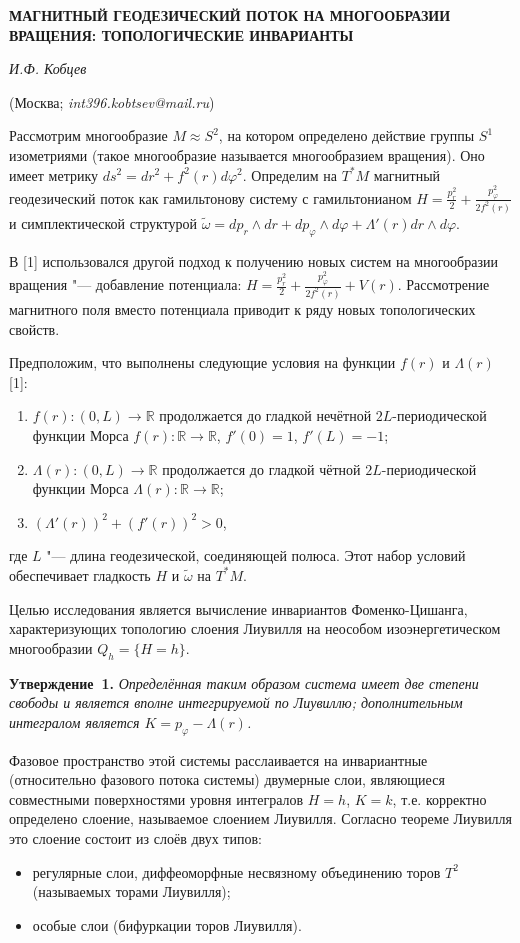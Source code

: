 \begin{center}
    {\bf МАГНИТНЫЙ ГЕОДЕЗИЧЕСКИЙ ПОТОК НА МНОГООБРАЗИИ ВРАЩЕНИЯ: ТОПОЛОГИЧЕСКИЕ ИНВАРИАНТЫ}

    {\it И.Ф. Кобцев}

    (Москва; {\it int396.kobtsev@mail.ru})
\end{center}

Рассмотрим многообразие $M \approx S^2$, на котором определено действие группы $S^1$ изометриями (такое многообразие называется многообразием вращения). Оно имеет метрику $ds^2=dr^2+f^2(r)d\varphi^2$. Определим на $T^*M$ магнитный геодезический поток как гамильтонову систему с гамильтонианом $H = \frac{p_r^2}{2}+\frac{p_\varphi^2}{2f^2(r)}$ и симплектической структурой $\widetilde{\omega}=dp_r \wedge dr + dp_\varphi \wedge d\varphi+\Lambda'(r)dr \wedge d\varphi$.

В [1] использовался другой подход к получению новых систем на многообразии вращения "--- добавление потенциала: $H = \frac{p_r^2}{2}+\frac{p_\varphi^2}{2f^2(r)}+V(r)$. Рассмотрение магнитного поля вместо потенциала приводит к ряду новых топологических свойств.

Предположим, что выполнены следующие условия на функции $f(r)$ и $\Lambda(r)$ [1]:
\begin{enumerate}
	\item $f(r):(0,L)\to \mathbb{R}$ продолжается до гладкой нечётной $2L$-периодической функции Морса $f(r):\mathbb{R}\to \mathbb{R}$, $f'(0)=1$, $f'(L)=-1$;
	\item $\Lambda(r):(0,L)\to \mathbb{R}$ продолжается до гладкой чётной $2L$-периодической функции Морса $\Lambda(r):\mathbb{R}\to \mathbb{R}$;
	\item $(\Lambda'(r))^2+(f'(r))^2>0$,
\end{enumerate}
где $L$ "--- длина геодезической, соединяющей полюса. Этот набор условий обеспечивает гладкость $H$ и $\widetilde{\omega}$ на $T^*M$.

Целью исследования является вычисление инвариантов Фоменко-Цишанга, характеризующих топологию слоения Лиувилля на неособом изоэнергетическом многообразии $Q_h=\{H=h\}$.

\textbf{Утверждение~1.} {\it Определённая таким образом система имеет две степени свободы и является вполне интегрируемой по Лиувиллю; дополнительным интегралом является $K=p_\varphi-\Lambda(r)$.}

Фазовое пространство этой системы расслаивается на инвариантные (относительно фазового потока системы) двумерные слои, являющиеся совместными поверхностями уровня интегралов $H=h$, $K=k$, т.е. корректно определено слоение, называемое слоением Лиувилля. Согласно теореме Лиувилля это слоение состоит из слоёв двух типов:
\begin{itemize}
	\item регулярные слои, диффеоморфные несвязному объединению торов $T^2$ (называемых торами Лиувилля);
	\item особые слои (бифуркации торов Лиувилля).
\end{itemize}

